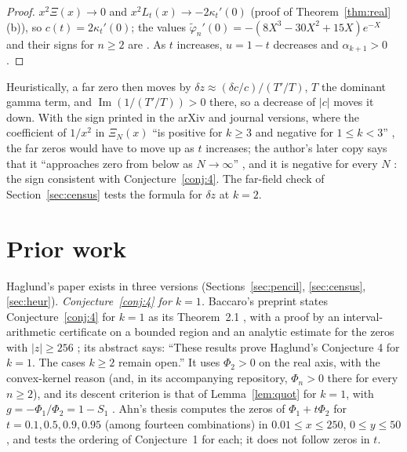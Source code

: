 \documentclass[11pt]{article}
\theoremstyle{plain}
\theoremstyle{definition}
\theoremstyle{remark}
\newcommand{\im}{\operatorname{Im}}
\newcommand{\tphi}{\widetilde{\varphi}}
\begin{document}
\begin{proof}
$x^2\Xi(x) \to 0$ and $x^2L_t(x) \to -2\kappa_t'(0)$ (proof of
Theorem~\ref{thm:real}(b)), so $c(t) = 2\kappa_t'(0)$; the values
$\tphi_n'(0) = -(8X^3 - 30X^2 + 15X)e^{-X}$ and their signs for $n \ge 2$ are
\cite[Proposition~3.4 and its proof]{Tya}. As $t$ increases, $u = 1 - t$
decreases and $\alpha_{k+1} > 0$.
\end{proof}

Heuristically, a far zero then moves by $\delta z \approx (\delta c/c)/(T'/T)$,
$T$ the dominant gamma term, and $\im(1/(T'/T)) > 0$ there, so a decrease of
$|c|$ moves it down. With the sign printed in the arXiv and journal versions,
where the coefficient of $1/x^2$ in $\Xi_N(x)$ ``is positive for $k \ge 3$ and
negative for $1 \le k < 3$'' \cite[p.~10]{Hag}, the far zeros would have to
move up as $t$ increases; the author's later copy says that it ``approaches zero
from below as $N \to \infty$'' \cite[p.~10]{HagW}, and it is negative for every
$N$ \cite[Proposition~3.4]{Tya}: the sign consistent with
Conjecture~\ref{conj:4}. The far-field check of Section~\ref{sec:census} tests
the formula for $\delta z$ at $k = 2$.


\section{Prior work}\label{sec:prior}

Haglund's paper exists in three versions \cite{Hag, HagJ, HagW}
(Sections~\ref{sec:pencil}, \ref{sec:census}, \ref{sec:heur}).
\emph{Conjecture~\ref{conj:4} for $k = 1$.} Baccaro's preprint \cite{Bac}
states Conjecture~\ref{conj:4} for $k = 1$ as its Theorem~2.1 \cite[p.~2]{Bac},
with a proof by an interval-arithmetic certificate on a bounded region and an
analytic estimate for the zeros with $|z| \ge 256$ \cite[(11), p.~3]{Bac}; its
abstract says: ``These results prove Haglund's Conjecture 4 for $k = 1$. The
cases $k \ge 2$ remain open.'' It uses $\Phi_2 > 0$ on the real axis, with the
convex-kernel reason \cite[(12), p.~3]{Bac} (and, in its accompanying
repository, $\Phi_n > 0$ there for every $n \ge 2$), and its descent criterion is that of
Lemma~\ref{lem:quot} for $k = 1$, with $g = -\Phi_1/\Phi_2 = 1 - S_1$
\cite[(7)--(10), p.~2]{Bac}. Ahn's thesis \cite{Ahn} computes the zeros of $\Phi_1 + t\Phi_2$
for $t = 0.1, 0.5, 0.9, 0.95$ (among fourteen combinations) in
$0.01 \le x \le 250$, $0 \le y \le 50$, and tests the ordering of
Conjecture~1 for each; it does not follow zeros in $t$.
\end{document}
